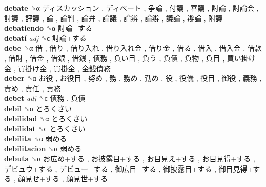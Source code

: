\textbf{debate} ␝α   ディスカッション ,  ディベート ,  争論 ,  付議 ,  審議 ,  討論 ,  討論会 ,  討議 ,  評議 ,  論 ,  論判 ,  論弁 ,  論議 ,  論辨 ,  論辯 ,  議論 ,  辯論 ,  附議   \\
\textbf{debatiendo} ␝α   討論+する   \\
\textbf{debatí} \emph{adj}  ␝ϲ   討論+する   \\
\textbf{debe} ␝α   借 ,  借り ,  借り入れ ,  借り入れ金 ,  借り金 ,  借る ,  借入 ,  借入金 ,  借款 ,  借財 ,  借金 ,  借銀 ,  借銭 ,  債務 ,  負い目 ,  負う ,  負債 ,  負物 ,  負目 ,  買い掛け金 ,  買掛け金 ,  買掛金 ,  金銭債務   \\
\textbf{deber} ␝α   お役 ,  お役目 ,  努め ,  務 ,  務め ,  勤め ,  役 ,  役儀 ,  役目 ,  御役 ,  義務 ,  責め ,  責任 ,  責務   \\
\textbf{debet} \emph{adj}  ␝ϲ   債務 ,  負債   \\
\textbf{debil} ␝α   とろくさい   \\
\textbf{debilidad} ␝α   とろくさい   \\
\textbf{debilidat} ␝ϲ   とろくさい   \\
\textbf{debilita} ␝α   弱める   \\
\textbf{debilitacion} ␝α   弱める   \\
\textbf{debuta} ␝α   お広め+する ,  お披露目+する ,  お目見え+する ,  お目見得+する ,  デビュウ+する ,  デビュー+する ,  御広目+する ,  御披露目+する ,  御目見得+する ,  顔見せ+する ,  顔見世+する   \\
